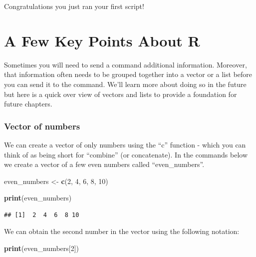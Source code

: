 \documentclass[
]{krantz}
\makeatletter
\newenvironment{Shaded}{\begin{snugshade}}{\end{snugshade}}
\newcommand{\DecValTok}[1]{\textcolor[rgb]{0.06,0.06,0.06}{#1}}
\newcommand{\KeywordTok}[1]{\textcolor[rgb]{0.27,0.27,0.27}{\textbf{#1}}}
\newcommand{\NormalTok}[1]{#1}
\newcommand{\StringTok}[1]{\textcolor[rgb]{0.5,0.5,0.5}{#1}}
\newenvironment{kframe}{%
\medskip{}
\setlength{\fboxsep}{.8em}
 \def\at@end@of@kframe{}%
 \ifinner\ifhmode%
  \def\at@end@of@kframe{\end{minipage}}%
  \begin{minipage}{\columnwidth}%
 \fi\fi%
 \def\FrameCommand##1{\hskip\@totalleftmargin \hskip-\fboxsep
 \colorbox{shadecolor}{##1}\hskip-\fboxsep
     \hskip-\linewidth \hskip-\@totalleftmargin \hskip\columnwidth}%
 \MakeFramed {\advance\hsize-\width
   \@totalleftmargin\z@ \linewidth\hsize
   \@setminipage}}%
 {\par\unskip\endMakeFramed%
 \at@end@of@kframe}
\renewenvironment{Shaded}{\begin{kframe}}{\end{kframe}}
\makeatother
\begin{document}
Congratulations you just ran your first script!

\hypertarget{a-few-key-points-about-r}{%
\section{A Few Key Points About R}\label{a-few-key-points-about-r}}

Sometimes you will need to send a command additional information. Moreover, that information often needs to be grouped together into a vector or a list before you can send it to the command. We'll learn more about doing so in the future but here is a quick over view of vectors and lists to provide a foundation for future chapters.

\hypertarget{vector-of-numbers}{%
\subsubsection{Vector of numbers}\label{vector-of-numbers}}

We can create a vector of only numbers using the ``c'' function - which you can think of as being short for ``combine'' (or concatenate). In the commands below we create a vector of a few even numbers called ``even\_numbers''.

\begin{Shaded}
\begin{Highlighting}[]
\NormalTok{even_numbers <-}\StringTok{ }\KeywordTok{c}\NormalTok{(}\DecValTok{2}\NormalTok{, }\DecValTok{4}\NormalTok{, }\DecValTok{6}\NormalTok{, }\DecValTok{8}\NormalTok{, }\DecValTok{10}\NormalTok{)}
\end{Highlighting}
\end{Shaded}

\begin{Shaded}
\begin{Highlighting}[]
\KeywordTok{print}\NormalTok{(even_numbers)}
\end{Highlighting}
\end{Shaded}

\begin{verbatim}
## [1]  2  4  6  8 10
\end{verbatim}

We can obtain the second number in the vector using the following notation:

\begin{Shaded}
\begin{Highlighting}[]
\KeywordTok{print}\NormalTok{(even_numbers[}\DecValTok{2}\NormalTok{])}
\end{Highlighting}
\end{Shaded}
\end{document}
